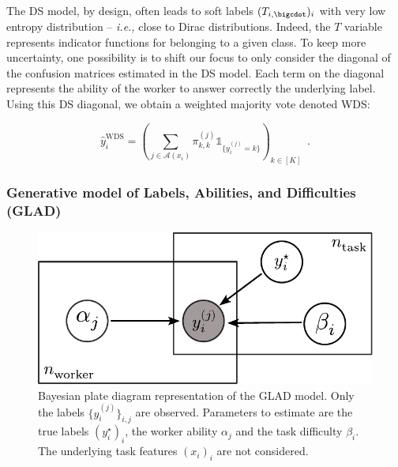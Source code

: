 The DS model, by design, often leads to soft labels $(T_{i,\bigcdot})_i$ with very low entropy distribution -- \emph{i.e.,} close to Dirac distributions.
Indeed, the $T$ variable represents indicator functions for belonging to a given class.
To keep more uncertainty, one possibility is to shift our focus to only consider the diagonal of the confusion matrices estimated in the DS model.
Each term on the diagonal represents the ability of the worker to answer correctly the underlying label.
Using this DS diagonal, we obtain a weighted majority vote denoted WDS:

\begin{equation}
    \hat y_i^{\mathrm{WDS}} = \left(\sum_{j\in\mathcal{A}(x_i)} \pi^{(j)}_{k,k}\mathds{1}_{\{y_i^{(j)}=k\}}\right)_{k\in[K]} \enspace.
\end{equation}

\subsubsection{Generative model of Labels, Abilities, and Difficulties (GLAD)}
\label{subsub:glad}

\begin{figure}[thb]
    \centering
    \includegraphics[width=.6\linewidth]{chapters/images/glad_plaque.pdf}
    \caption{Bayesian plate diagram representation of the GLAD model. Only the labels $\{y_i^{(j)}\}_{i,j}$ are observed. Parameters to estimate are the true labels $(y_i^\star)_i$, the worker ability $\alpha_j$ and the task difficulty $\beta_i$. The underlying task features $(x_i)_i$ are not considered.}
    \label{fig:plaque_glad}
\end{figure}


